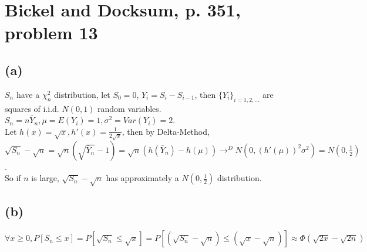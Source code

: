 \def\thecourse{18.466}
\def\thestudent{Zhilei Xu (929552018)}
\def\theprob{4}


\section{Bickel and Docksum, p. 351, problem 13}
\subsection*{(a)}
$S_n$ have a $\chi_n^2$ distribution,
let $S_0 = 0$, $Y_i = S_i - S_{i-1}$,
then $\{Y_i\}_{i=1,2,\dots}$ are squares of i.i.d. $N(0,1)$ random variables.
$S_n = n\bar{Y}_n, \mu = E(Y_i) = 1,
\sigma^2 = Var(Y_i) = 2$.
\\
Let $h(x) = \sqrt{x}, h'(x) = \frac{1}{2\sqrt{x}}$,
then by Delta-Method,\\
$\sqrt{S_n} - \sqrt{n} =
\sqrt{n}(\sqrt{\bar{Y}_n} - 1) =
\sqrt{n}(h(\bar{Y}_n) - h(\mu))
\to^{D} N(0, (h'(\mu))^2\sigma^2) = N(0, \frac{1}{2})
$.\\
So if $n$ is large, $\sqrt{S_n} - \sqrt{n}$ has approximately a $N(0, \frac{1}{2})$ distribution.

\subsection*{(b)}
$
\forall x \geq 0,
P[S_n \leq x] = P[\sqrt{S_n} \leq \sqrt{x}] =
P[(\sqrt{S_n}-\sqrt{n}) \leq (\sqrt{x} - \sqrt{n})] \approx
\Phi(\sqrt{2x} - \sqrt{2n})
$

